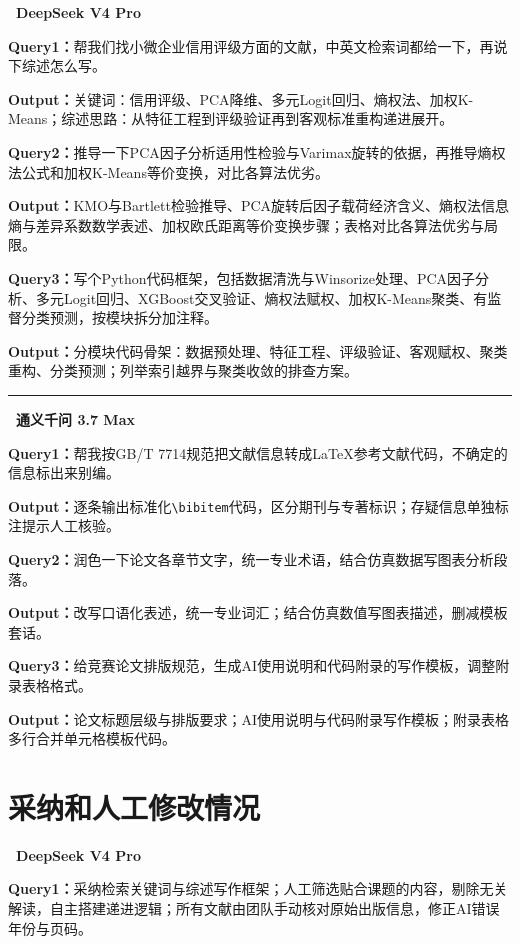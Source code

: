 \documentclass[12pt,a4paper]{ctexart}
\begin{document}
\noindent\textbf{\textbullet~DeepSeek V4 Pro}

\textbf{Query1：}帮我们找小微企业信用评级方面的文献，中英文检索词都给一下，再说下综述怎么写。

\textbf{Output：}关键词：信用评级、PCA降维、多元Logit回归、熵权法、加权K-Means；综述思路：从特征工程到评级验证再到客观标准重构递进展开。

\textbf{Query2：}推导一下PCA因子分析适用性检验与Varimax旋转的依据，再推导熵权法公式和加权K-Means等价变换，对比各算法优劣。

\textbf{Output：}KMO与Bartlett检验推导、PCA旋转后因子载荷经济含义、熵权法信息熵与差异系数数学表述、加权欧氏距离等价变换步骤；表格对比各算法优劣与局限。

\textbf{Query3：}写个Python代码框架，包括数据清洗与Winsorize处理、PCA因子分析、多元Logit回归、XGBoost交叉验证、熵权法赋权、加权K-Means聚类、有监督分类预测，按模块拆分加注释。

\textbf{Output：}分模块代码骨架：数据预处理、特征工程、评级验证、客观赋权、聚类重构、分类预测；列举索引越界与聚类收敛的排查方案。

\noindent\rule{\linewidth}{0.4pt}

\noindent\textbf{\textbullet~通义千问 3.7 Max}

\textbf{Query1：}帮我按GB/T 7714规范把文献信息转成LaTeX参考文献代码，不确定的信息标出来别编。

\textbf{Output：}逐条输出标准化\verb|\bibitem|代码，区分期刊与专著标识；存疑信息单独标注提示人工核验。

\textbf{Query2：}润色一下论文各章节文字，统一专业术语，结合仿真数据写图表分析段落。

\textbf{Output：}改写口语化表述，统一专业词汇；结合仿真数值写图表描述，删减模板套话。

\textbf{Query3：}给竞赛论文排版规范，生成AI使用说明和代码附录的写作模板，调整附录表格格式。

\textbf{Output：}论文标题层级与排版要求；AI使用说明与代码附录写作模板；附录表格多行合并单元格模板代码。

\section{采纳和人工修改情况}

\noindent\textbf{\textbullet~DeepSeek V4 Pro}

\textbf{Query1：}采纳检索关键词与综述写作框架；人工筛选贴合课题的内容，剔除无关解读，自主搭建递进逻辑；所有文献由团队手动核对原始出版信息，修正AI错误年份与页码。
\end{document}
